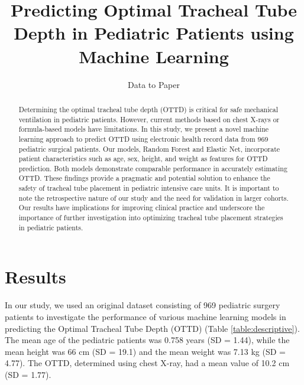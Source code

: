 \documentclass[11pt]{article}
\title{Predicting Optimal Tracheal Tube Depth in Pediatric Patients using Machine Learning}
\author{Data to Paper}
\begin{document}
\maketitle
\begin{abstract}
Determining the optimal tracheal tube depth (OTTD) is critical for safe mechanical ventilation in pediatric patients. However, current methods based on chest X-rays or formula-based models have limitations. In this study, we present a novel machine learning approach to predict OTTD using electronic health record data from 969 pediatric surgical patients. Our models, Random Forest and Elastic Net, incorporate patient characteristics such as age, sex, height, and weight as features for OTTD prediction. Both models demonstrate comparable performance in accurately estimating OTTD. These findings provide a pragmatic and potential solution to enhance the safety of tracheal tube placement in pediatric intensive care units. It is important to note the retrospective nature of our study and the need for validation in larger cohorts. Our results have implications for improving clinical practice and underscore the importance of further investigation into optimizing tracheal tube placement strategies in pediatric patients.
\end{abstract}
\section*{Results}

In our study, we used an original dataset consisting of 969 pediatric surgery patients to investigate the performance of various machine learning models in predicting the Optimal Tracheal Tube Depth (OTTD) (Table \ref{table:descriptive}). The mean age of the pediatric patients was 0.758 years (SD = 1.44), while the mean height was 66 cm (SD = 19.1) and the mean weight was 7.13 kg (SD = 4.77). The OTTD, determined using chest X-ray, had a mean value of 10.2 cm (SD = 1.77).
\end{document}
